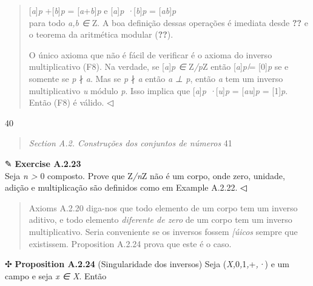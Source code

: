 \documentclass[
]{article}
\begin{document}
\begin{quote}
{[}\emph{a}{]}\emph{p} +{[}\emph{b}{]}\emph{p} =
{[}\emph{a}+\emph{b}{]}\emph{p} e {[}\emph{a}{]}\emph{p
·}{[}\emph{b}{]}\emph{p} = {[}\emph{ab}{]}\emph{p}\\
para todo \emph{a,b ∈} Z. A boa definição dessas operações é imediata
desde \textbf{??} e o teorema da aritmética modular (\textbf{??}).

O único axioma que não é fácil de verificar é o axioma do inverso
multiplicativo (F8). Na verdade, se {[}\emph{a}{]}\emph{p ∈} Z\emph{/p}Z
então {[}\emph{a}{]}\emph{p ̸}= {[}0{]}\emph{p} se e somente se \emph{p}
∤ \emph{a}. Mas se \emph{p} ∤ \emph{a} então \emph{a ⊥ p}, então
\emph{a} tem um inverso multiplicativo \emph{u} módulo \emph{p}. Isso
implica que {[}\emph{a}{]}\emph{p ·}{[}\emph{u}{]}\emph{p} =
{[}\emph{au}{]}\emph{p} = {[}1{]}\emph{p}. Então (F8) é válido. ◁
\end{quote}

40

\begin{quote}
\emph{Section A.2. Construções dos conjuntos de números} 41
\end{quote}

✎ \textbf{Exercise A.2.23}\\
Seja \emph{n \textgreater{}} 0 composto. Prove que Z\emph{/n}Z não é um
corpo, onde zero, unidade, adição e multiplicação são definidos como em
Example A.2.22. ◁

\begin{quote}
Axioms A.2.20 diga-nos que todo elemento de um corpo tem um inverso
aditivo, e todo elemento \emph{diferente de zero} de um corpo tem um
inverso multiplicativo. Seria conveniente se os inversos fossem
\emph{{[}úicos} sempre que existissem. Proposition A.2.24 prova que este
é o caso.
\end{quote}

✣ \textbf{Proposition A.2.24} (Singularidade dos inversos) Seja
(\emph{X,}0\emph{,}1\emph{,}+\emph{,·}) e um campo e seja \emph{x ∈ X}.
Então
\end{document}
